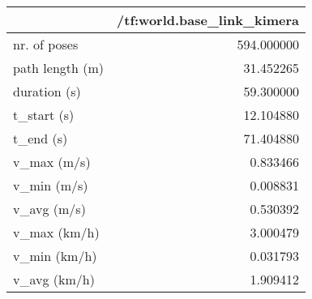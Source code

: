 \begin{tabular}{lr}
\toprule
{} &  /tf:world.base\_link\_kimera \\
\midrule
nr. of poses    &                  594.000000 \\
path length (m) &                   31.452265 \\
duration (s)    &                   59.300000 \\
t\_start (s)     &                   12.104880 \\
t\_end (s)       &                   71.404880 \\
v\_max (m/s)     &                    0.833466 \\
v\_min (m/s)     &                    0.008831 \\
v\_avg (m/s)     &                    0.530392 \\
v\_max (km/h)    &                    3.000479 \\
v\_min (km/h)    &                    0.031793 \\
v\_avg (km/h)    &                    1.909412 \\
\bottomrule
\end{tabular}
